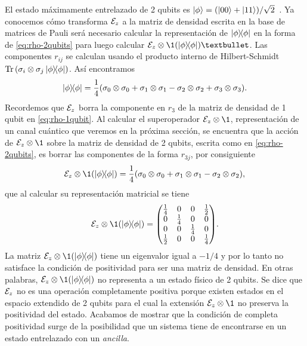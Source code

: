 El estado máximamente entrelazado de 2 qubits es
$\ket{\phi}=\qty(\ket{00}+\ket{11})/\sqrt{2}$~\cite{bengtsson_zyczkowski_2017}.
Ya conocemos cómo transforma $\mathcal{E}_z$ a la matriz de densidad 
escrita en la base de matrices de Pauli será necesario calcular 
la representación de $\dyad{\phi}{\phi}$ en la forma de \eqref{eq:rho-2qubits}
para luego calcular $\E_z\ot \1(\dyad{\phi}{\phi})•$.
Las componentes $r_{ij}$ se calculan usando el producto interno
de Hilbert-Schmidt $\Tr\qty(\pauli{i}{j}\dyad{\phi}{\phi})$.
Así encontramos 
\begin{align}
\dyad{\phi}{\phi}=\frac{1}{4}\qty(
\pauli{0}{0}+\pauli{1}{1}-\pauli{2}{2}+\pauli{3}{3}).
\end{align}
Recordemos que $\mathcal{E}_z$ borra la componente en $r_3$ de la
matriz de densidad de 1 qubit en \eqref{eq:rho-1qubit}. 
Al calcular el superoperador $\E_z\ot  \1$, representación de 
un canal cuántico que veremos en la próxima sección, se encuentra
que la acción de $\E_z\otimes\1$ sobre la matriz de densidad de 2 qubits,
escrita como en \eqref{eq:rho-2qubits}, es borrar 
las componentes de la forma $r_{3j}$,
por consiguiente
\begin{align}
\E_z\otimes\1 \qty(\dyad{\phi}{\phi})=\frac{1}{4}\qty(
\pauli{0}{0}+\pauli{1}{1}-\pauli{2}{2}),
\end{align}
que al calcular su representación matricial se tiene
\begin{align}
\E_z\otimes\1 \qty(\dyad{\phi}{\phi})=
\mqty( 
\frac{1}{4} & 0 & 0 & \frac{1}{2} \\
0 & \frac{1}{4} & 0 & 0 \\
0 & 0 & \frac{1}{4} & 0 \\
\frac{1}{2} & 0 & 0 & \frac{1}{4} \\
).
\end{align}
La matriz  $\E_z\otimes\1\qty(\dyad{\phi}{\phi})$ tiene un 
eigenvalor igual a $-1/4$ y por lo tanto no satisface la condición 
de positividad para ser una matriz de densidad.  
En otras palabras, $\E_z\otimes\1\qty(\dyad{\phi}{\phi})$ 
no representa a un estado físico de 2 qubits.
Se dice que $\mathcal{E}_z$ no es una operación completamente 
positiva porque existen estados en el espacio extendido de 2 qubits para 
el cual la extensión $\E_z\ot \1$ no preserva la positividad del estado. 
Acabamos de mostrar que la condición de completa
positividad surge de la posibilidad que un sistema tiene de encontrarse 
en un estado entrelazado con un \textit{ancilla}.

